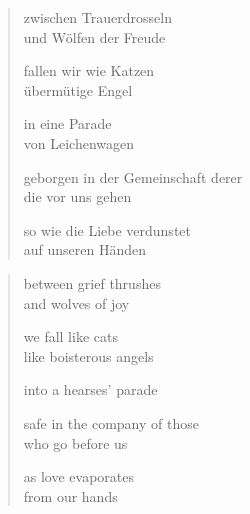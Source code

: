 
\cleartoverso


\begin{verse}

zwischen Trauerdrosseln\\
und Wölfen der Freude

fallen wir wie Katzen\\
übermütige Engel

in eine Parade\label{rilke}\\
von Leichenwagen

geborgen in der Gemeinschaft derer\\
die vor uns gehen

so wie die Liebe verdunstet\\
auf unseren Händen

\end{verse}

\clearpage


\begin{verse}

between grief thrushes\\
and wolves of joy

we fall like cats\\
like boisterous angels

into a hearses' parade

safe in the company of those\\
who go before us

as love evaporates\\
from our hands

\end{verse}

